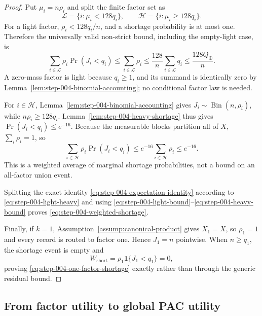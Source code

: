 \begin{proof}
Put \(\mu_i=n\rho_i\) and split the finite factor set as
\begin{equation}\label{eq:step-004-light-heavy}
\mathcal L=\{i:\mu_i<128q_i\},
\qquad
\mathcal H=\{i:\mu_i\ge128q_i\}.
\end{equation}
For a light factor, \(\rho_i<128q_i/n\), and a shortage probability is at
most one.  Therefore the universally valid non-strict bound, including
the empty-light case, is
\begin{equation}\label{eq:step-004-light-bound}
\sum_{i\in\mathcal L}\rho_i\Pr(J_i<q_i)
\le\sum_{i\in\mathcal L}\rho_i
\le\frac{128}{n}\sum_{i\in\mathcal L}q_i
\le\frac{128Q_\oplus}{n}.
\end{equation}
A zero-mass factor is light because \(q_i\ge1\), and its summand is
identically zero by Lemma~\ref{lem:step-004-binomial-accounting}; no
conditional factor law is needed.

For \(i\in\mathcal H\), Lemma~\ref{lem:step-004-binomial-accounting}
gives \(J_i\sim\operatorname{Bin}(n,\rho_i)\), while
\(n\rho_i\ge128q_i\).  Lemma~\ref{lem:step-004-heavy-shortage} thus gives
\(\Pr(J_i<q_i)\le e^{-16}\).  Because the measurable blocks partition
all of \(X\), \(\sum_i\rho_i=1\), so
\begin{equation}\label{eq:step-004-heavy-bound}
\sum_{i\in\mathcal H}\rho_i\Pr(J_i<q_i)
\le e^{-16}\sum_{i\in\mathcal H}\rho_i
\le e^{-16}.
\end{equation}
This is a weighted average of marginal shortage probabilities, not a
bound on an all-factor union event.

Splitting the exact identity
\eqref{eq:step-004-expectation-identity} according to
\eqref{eq:step-004-light-heavy} and using
\eqref{eq:step-004-light-bound}--\eqref{eq:step-004-heavy-bound} proves
\eqref{eq:step-004-weighted-shortage}.

Finally, if \(k=1\), Assumption~\ref{assump:canonical-product} gives
\(X_1=X\), so \(\rho_1=1\) and every record is routed to factor one.
Hence \(J_1=n\) pointwise.  When \(n\ge q_1\), the shortage event is
empty and
\[
W_{\mathrm{short}}
=\rho_1\mathbf 1\{J_1<q_1\}=0,
\]
proving \eqref{eq:step-004-one-factor-shortage} exactly rather than through
the generic residual bound.
\end{proof}

\subsection{From factor utility to global PAC utility}
\label{app:step-005}

